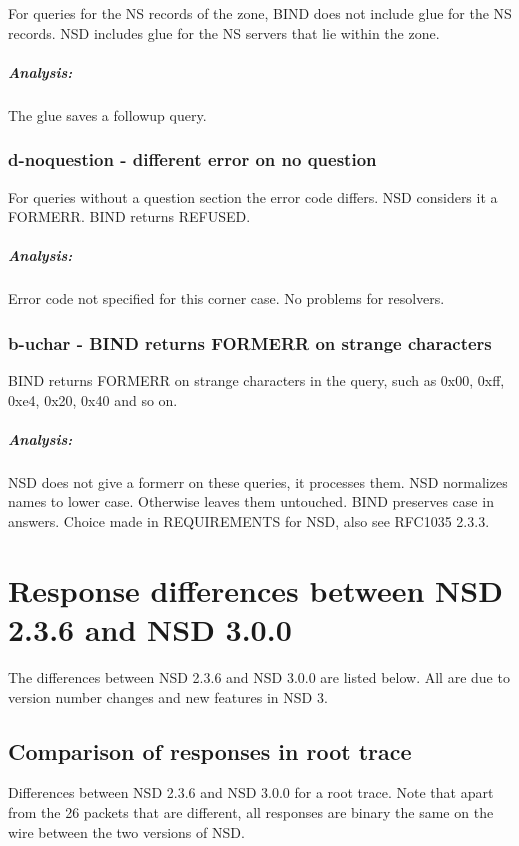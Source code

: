 \documentclass[twoside,titlepage,english]{nlnetlabs}
\begin{document}
For queries for the NS records of the zone, BIND does not include glue
for the NS records. NSD includes glue for the NS servers that lie within
the zone.

\vspace{-8pt}\subparagraph{Analysis:}

The glue saves a followup query.


\subsubsection{d-noquestion - different error on no question}
\label{d-noquestion}

For queries without a question section the error code differs.
NSD considers it a FORMERR. BIND returns REFUSED.

\vspace{-8pt}\subparagraph{Analysis:}

Error code not specified for this corner case. No problems for resolvers.


\subsubsection{b-uchar - BIND returns FORMERR on strange characters}
\label{b-uchar}

BIND returns FORMERR on strange characters in the query, such as
0x00, 0xff, 0xe4, 0x20, 0x40 and so on.

\vspace{-8pt}\subparagraph{Analysis:}

NSD does not give a formerr on these queries, it processes them.
NSD normalizes names to lower case. Otherwise leaves them untouched.
BIND preserves case in answers. Choice made in REQUIREMENTS for NSD,
also see RFC1035\cite{rfc1035} 2.3.3.


\section{Response differences between NSD 2.3.6 and NSD 3.0.0}

The differences between NSD 2.3.6 and NSD 3.0.0 are listed below. All are due
to version number changes and new features in NSD 3.


\subsection{Comparison of responses in root trace}

Differences between NSD 2.3.6 and NSD 3.0.0 for a root trace.
Note that apart from the 26 packets that are different, all responses are
binary the same on the wire between the two versions of NSD.
\end{document}
